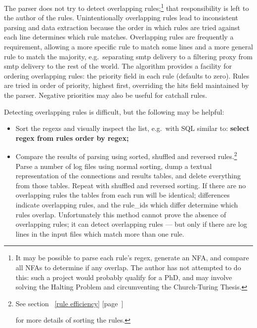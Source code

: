 \documentclass[a4paper,12pt,draft]{article}
\newcommand{\refwithpage}[1]{%
    \empty{}\ref{#1} [page~\pageref{#1}]%
}
\begin{document}
The parser does not try to detect overlapping rules;\footnote{It may be
possible to parse each rule's regex, generate an NFA, and compare all NFAs
to determine if any overlap.  The author has not attempted to do this: such
a project would probably qualify for a PhD, and may involve solving the
Halting Problem and circumventing the Church-Turing Thesis.} that
responsibility is left to the author of the rules.  Unintentionally
overlapping rules lead to inconsistent parsing and data extraction because
the order in which rules are tried against each line determines which rule
matches.  Overlapping rules are frequently a requirement, allowing a more
specific rule to match some lines and a more general rule to match the
majority, e.g.\ separating smtp delivery to a filtering proxy from smtp
delivery to the rest of the world.  The algorithm provides a facility for
ordering overlapping rules: the priority field in each rule (defaults to
zero).  Rules are tried in order of priority, highest first, overriding the
hits field maintained by the parser.  Negative priorities may also be
useful for catchall rules.

Detecting overlapping rules is difficult, but the following may be helpful:

\begin{itemize}

    \item Sort the regexs and visually inspect the list, e.g.\ with SQL
        similar to: \textbf{select regex from rules order by regex;}

    \item Compare the results of parsing using sorted, shuffled and
        reversed rules.\footnote{See section~\refwithpage{rule efficiency}
        for more details of sorting the rules.}  Parse a number of log
        files using normal sorting, dump a textual representation of the
        connections and results tables, and delete everything from those
        tables.  Repeat with shuffled and reversed sorting.  If there are
        no overlapping rules the tables from each run will be identical;
        differences indicate overlapping rules, and the rule\_ids which
        differ determine which rules overlap.  Unfortunately this method
        cannot prove the absence of overlapping rules; it can detect
        overlapping rules --- but only if there are log lines in the input
        files which match more than one rule.

\end{itemize}
\end{document}
